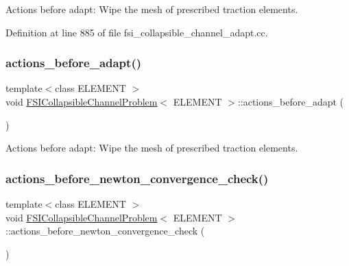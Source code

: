 Actions before adapt\+: Wipe the mesh of prescribed traction elements. 



Definition at line 885 of file fsi\+\_\+collapsible\+\_\+channel\+\_\+adapt.\+cc.

\mbox{\label{classFSICollapsibleChannelProblem_a91b30b3d0369c178d3a79f5658644f1b}} 
\subsubsection{\texorpdfstring{actions\+\_\+before\+\_\+adapt()}{actions\_before\_adapt()}\hspace{0.1cm}{\footnotesize\ttfamily [2/2]}}
{\footnotesize\ttfamily template$<$class E\+L\+E\+M\+E\+NT $>$ \\
void \hyperlink{classFSICollapsibleChannelProblem}{F\+S\+I\+Collapsible\+Channel\+Problem}$<$ E\+L\+E\+M\+E\+NT $>$\+::actions\+\_\+before\+\_\+adapt (\begin{DoxyParamCaption}{ }\end{DoxyParamCaption})}



Actions before adapt\+: Wipe the mesh of prescribed traction elements. 

\mbox{\label{classFSICollapsibleChannelProblem_ace5343d2e6e6e0480d077d4f17365288}} 
\subsubsection{\texorpdfstring{actions\+\_\+before\+\_\+newton\+\_\+convergence\+\_\+check()}{actions\_before\_newton\_convergence\_check()}\hspace{0.1cm}{\footnotesize\ttfamily [1/4]}}
{\footnotesize\ttfamily template$<$class E\+L\+E\+M\+E\+NT $>$ \\
void \hyperlink{classFSICollapsibleChannelProblem}{F\+S\+I\+Collapsible\+Channel\+Problem}$<$ E\+L\+E\+M\+E\+NT $>$\+::actions\+\_\+before\+\_\+newton\+\_\+convergence\+\_\+check (\begin{DoxyParamCaption}{ }\end{DoxyParamCaption})\hspace{0.3cm}{\ttfamily [inline]}}



